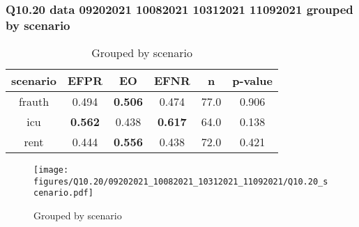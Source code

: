 \subsubsection{Q10.20 data 09202021 10082021 10312021 11092021 grouped by scenario}

\begin{comment}
               EFPR        EO      EFNR     n    pvalue
(frauth,)  0.493506  0.506494  0.474026  77.0  0.905639
(icu,)     0.562500  0.437500  0.617188  64.0  0.138333
(rent,)    0.444444  0.555556  0.437500  72.0  0.420925
\end{comment}

\begin{table}[h]
    \centering
    \begin{tabular}{|c|c|c|c|c|c|}
        \hline
        scenario & EFPR & EO & EFNR & n & p-value\\
        \hline
        frauth & 0.494 & \textbf{0.506} & 0.474 & 77.0 & 0.906\\
		icu & \textbf{0.562} & 0.438 & \textbf{0.617} & 64.0 & 0.138\\
		rent & 0.444 & \textbf{0.556} & 0.438 & 72.0 & 0.421\\
		
        \hline
    \end{tabular}
    \caption{Grouped by scenario}
    \label{tab:my_label}
\end{table}
\begin{figure}[h]
    \centering
    \texttt{[image: figures/Q10.20/09202021\_10082021\_10312021\_11092021/Q10.20\_scenario.pdf]}
    \caption{Grouped by scenario}
    \label{fig:my_label}
\end{figure}
